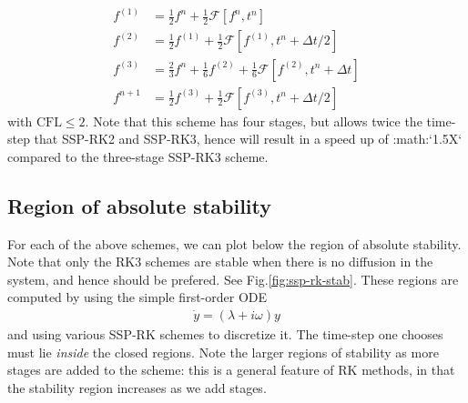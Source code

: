 \documentclass[12pt]{article}
\theoremstyle{definition}
\theoremstyle{definition}
\theoremstyle{definition}
\begin{document}
\begin{align}
   f^{(1)} &= \frac{1}{2} f^{n} + \frac{1}{2} \mathcal{F}[f^{n},t^n] \\
   f^{(2)} &= \frac{1}{2} f^{(1)} + \frac{1}{2} \mathcal{F}[f^{(1)},t^n+\Delta t/2] \\
   f^{(3)} &= \frac{2}{3} f^{n} + \frac{1}{6} f^{(2)} + \frac{1}{6} \mathcal{F}[f^{(2)},t^n+\Delta t] \\
   f^{n+1} &= \frac{1}{2} f^{(3)} + \frac{1}{2} \mathcal{F}[f^{(3)},t^n+\Delta t/2]
\end{align}
with $\mathrm{CFL}\le 2$. Note that this scheme has four stages, but
allows twice the time-step that SSP-RK2 and SSP-RK3, hence will result
in a speed up of :math:`1.5X` compared to the three-stage SSP-RK3
scheme.

\subsection{Region of absolute stability}

For each of the above schemes, we can plot below the region of
absolute stability. Note that only the RK3 schemes are stable when
there is no diffusion in the system, and hence should be prefered. See
Fig.\thinspace\ref{fig:ssp-rk-stab}. These regions are computed by
using the simple first-order ODE
\begin{align}
  \dot{y} = (\lambda+i\omega)y
\end{align}
and using various SSP-RK schemes to discretize it. The time-step one
chooses must lie \emph{inside} the closed regions. Note the larger
regions of stability as more stages are added to the scheme: this is a
general feature of RK methods, in that the stability region increases
as we add stages.
\end{document}
